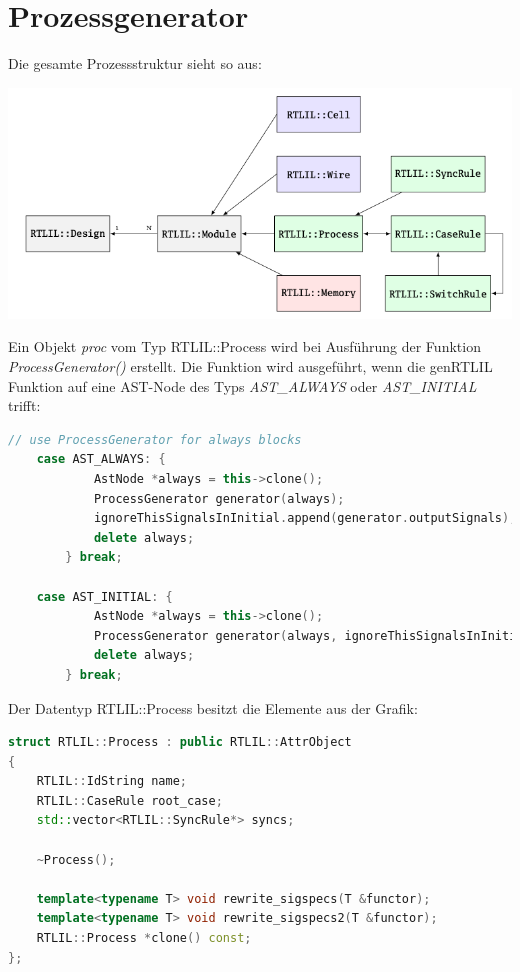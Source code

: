 \documentclass[11pt]{report}
\begin{document}




\section{Prozessgenerator}
Die gesamte Prozessstruktur sieht so aus:
\begin{center}
\includegraphics[scale=0.5]{process.png}
\end{center}
Ein Objekt \textit{proc} vom Typ RTLIL::Process wird bei Ausführung der Funktion \textit{ProcessGenerator()} erstellt.
Die Funktion wird ausgeführt, wenn die genRTLIL Funktion auf eine AST-Node des Typs \textit{AST\_ALWAYS} oder \textit{AST\_INITIAL} trifft:
\begin{lstlisting}[language=C++]
	// use ProcessGenerator for always blocks
	case AST_ALWAYS: {
			AstNode *always = this->clone();
			ProcessGenerator generator(always);
			ignoreThisSignalsInInitial.append(generator.outputSignals);
			delete always;
		} break;

	case AST_INITIAL: {
			AstNode *always = this->clone();
			ProcessGenerator generator(always, ignoreThisSignalsInInitial);
			delete always;
		} break;
\end{lstlisting}
Der Datentyp RTLIL::Process besitzt die Elemente aus der Grafik:
\begin{lstlisting}[language=C++]
struct RTLIL::Process : public RTLIL::AttrObject
{
	RTLIL::IdString name;
	RTLIL::CaseRule root_case;
	std::vector<RTLIL::SyncRule*> syncs;

	~Process();

	template<typename T> void rewrite_sigspecs(T &functor);
	template<typename T> void rewrite_sigspecs2(T &functor);
	RTLIL::Process *clone() const;
};
\end{lstlisting}
\end{document}
